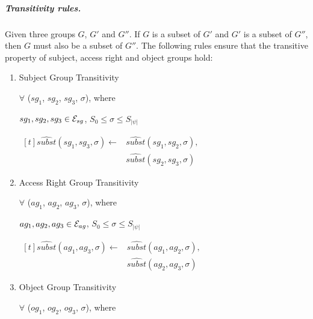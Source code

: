 \documentclass[11pt, twocolumn]{article}
\begin{document}
          \subparagraph{Transitivity rules.}

            Given three groups $G$, $G'$ and $G''$. If $G$ is a subset of $G'$
            and $G'$ is a subset of $G''$, then $G$ must also be a subset of
            $G''$. The following rules ensure that the transitive property of
            subject, access right and object groups hold:

            \begin{enumerate}
              \item
                Subject Group Transitivity

                $\forall$ ($sg_{1}$, $sg_{2}$, $sg_{3}$, $\sigma$), where

                $sg_{1}, sg_{2}, sg_{3} \in {\cal E}_{sg}$,
                $S_{0} \leq \sigma \leq S_{|\psi|}$

                \begin{math}
                  \begin{aligned}[t]
                    \hat{subst}(sg_{1}, sg_{3}, \sigma) \leftarrow &
                    \hat{subst}(sg_{1}, sg_{2}, \sigma), \\
                    & \hat{subst}(sg_{2}, sg_{3}, \sigma)
                  \end{aligned}
                \end{math}

              \item
                Access Right Group Transitivity

                $\forall$ ($ag_{1}$, $ag_{2}$, $ag_{3}$, $\sigma$), where

                $ag_{1}, ag_{2}, ag_{3} \in {\cal E}_{ag}$,
                $S_{0} \leq \sigma \leq S_{|\psi|}$

                \begin{math}
                  \begin{aligned}[t]
                    \hat{subst}(ag_{1}, ag_{3}, \sigma) \leftarrow &
                    \hat{subst}(ag_{1}, ag_{2}, \sigma), \\
                    & \hat{subst}(ag_{2}, ag_{3}, \sigma)
                  \end{aligned}
                \end{math}

              \item
                Object Group Transitivity

                $\forall$ ($og_{1}$, $og_{2}$, $og_{3}$, $\sigma$), where


\end{enumerate}
\end{document}
